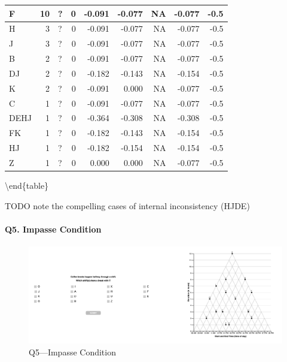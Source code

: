 \documentclass[
  letterpaper,
  DIV=11,
  numbers=noendperiod]{scrreprt}
\let\oldparagraph\paragraph
\renewcommand{\paragraph}[1]{\oldparagraph{#1}\mbox{}}
\begin{document}
\begin{tabular}[t]{l|r|l|r|r|r|r|r|r}
\hline
\hspace{1em}F & 10 & ? & 0 & -0.091 & -0.077 & NA & -0.077 & -0.5\\
\hline
\hspace{1em}H & 3 & ? & 0 & -0.091 & -0.077 & NA & -0.077 & -0.5\\
\hline
\hspace{1em}J & 3 & ? & 0 & -0.091 & -0.077 & NA & -0.077 & -0.5\\
\hline
\hspace{1em}B & 2 & ? & 0 & -0.091 & -0.077 & NA & -0.077 & -0.5\\
\hline
\hspace{1em}DJ & 2 & ? & 0 & -0.182 & -0.143 & NA & -0.154 & -0.5\\
\hline
\hspace{1em}K & 2 & ? & 0 & -0.091 & 0.000 & NA & -0.077 & -0.5\\
\hline
\hspace{1em}C & 1 & ? & 0 & -0.091 & -0.077 & NA & -0.077 & -0.5\\
\hline
\hspace{1em}DEHJ & 1 & ? & 0 & -0.364 & -0.308 & NA & -0.308 & -0.5\\
\hline
\hspace{1em}FK & 1 & ? & 0 & -0.182 & -0.143 & NA & -0.154 & -0.5\\
\hline
\hspace{1em}HJ & 1 & ? & 0 & -0.182 & -0.154 & NA & -0.154 & -0.5\\
\hline
\hspace{1em}Z & 1 & ? & 0 & 0.000 & 0.000 & NA & -0.077 & -0.5\\
\hline
\end{tabular}

\textbackslash end\{table\}

TODO note the compelling cases of internal inconsistency (HJDE)

\hypertarget{q5.-impasse-condition}{%
\paragraph{Q5. Impasse Condition}\label{q5.-impasse-condition}}

\begin{figure}

{\centering \includegraphics{analysis/SGC3A/static/questions/Q5_121.png}

}

\caption{\label{fig-Q5-121}Q5---Impasse Condition}

\end{figure}
\end{document}
